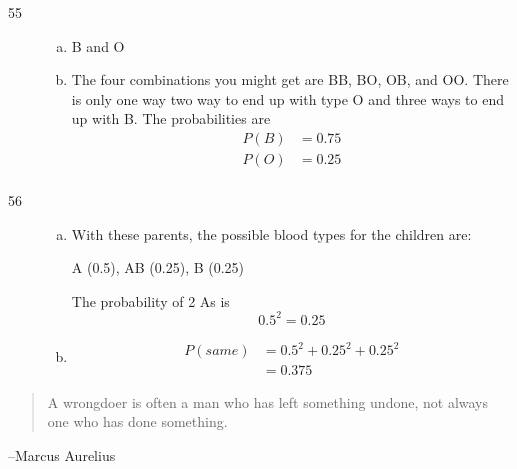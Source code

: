 \documentclass[letterpaper, landscape]{exam}
\begin{document}
\begin{description}
    \item[55]
      \begin{enumerate}[(a)]
        \item B and O

        \item
          The four combinations you might get are BB, BO, OB, and OO\@. There is
          only one way two way to end up with type O and three ways to end up
          with B. The probabilities are
          \begin{align*}
            P(B) & = 0.75 \\
            P(O) & = 0.25 \\
          \end{align*}
      \end{enumerate}

    \item[56]
      \begin{enumerate}[(a)]
        \item 
          With these parents, the possible blood types for the children are: 
          
          A (0.5), AB (0.25), B (0.25)

          The probability of 2 As is 
          \[
            0.5^2 = \boxed{ 0.25 }
          \]

        \item 
          \begin{align*}
            P(same) & = 0.5^2 + 0.25^2 + 0.25^2 \\
                    & = \boxed{ 0.375 }
          \end{align*}
      \end{enumerate}
  \end{description}

  \else
    \vspace{11 cm}
    \begin{quote}
      \begin{em}
        A wrongdoer is often a man who has left something undone, not always one
        who has done something.
      \end{em}
    \end{quote}
    \hspace{1 cm}--Marcus Aurelius
  \fi
\end{document}
